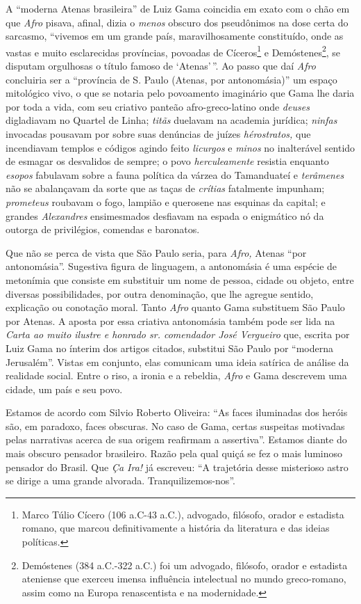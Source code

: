 A ``moderna Atenas brasileira'' de Luiz Gama coincidia em exato com o chão
em que \emph{Afro} pisava, afinal, dizia o \emph{menos} obscuro dos
pseudônimos na dose certa do sarcasmo, ``vivemos em um grande país,
maravilhosamente constituído, onde as vastas e muito esclarecidas
províncias, povoadas de Cíceros\footnote{Marco Túlio Cícero (106
  a.C-43 a.C.), advogado, filósofo, orador e estadista romano, que
  marcou definitivamente a história da literatura e das ideias
  políticas.} e Demóstenes\footnote{Demóstenes (384 a.C.-322 a.C.) foi
  um advogado, filósofo, orador e estadista ateniense que exerceu imensa
  influência intelectual no mundo greco-romano, assim como na Europa
  renascentista e na modernidade.}, se disputam orgulhosas o título
famoso de `Atenas'\,''. Ao passo que daí \emph{Afro} concluiria ser a
``província de S. Paulo (Atenas, por antonomásia)'' um espaço mitológico
vivo, o que se notaria pelo povoamento imaginário que Gama lhe daria por
toda a vida, com seu criativo panteão afro-greco-latino onde
\emph{deuses} digladiavam no Quartel de Linha; \emph{titãs} duelavam na
academia jurídica; \emph{ninfas} invocadas pousavam por sobre suas
denúncias de juízes \emph{hérostratos,} que incendiavam templos e
códigos agindo feito \emph{licurgos} e \emph{minos} no inalterável
sentido de esmagar os desvalidos de sempre; o povo \emph{herculeamente}
resistia enquanto \emph{esopos} fabulavam sobre a fauna política da
várzea do Tamanduateí e \emph{terâmenes} não se abalançavam da sorte que
as taças de \emph{crítias} fatalmente impunham; \emph{prometeus}
roubavam o fogo, lampião e querosene nas esquinas da capital; e grandes
\emph{Alexandres} ensimesmados desfiavam na espada o enigmático nó da
outorga de privilégios, comendas e baronatos.

Que não se perca de vista que São Paulo seria, para \emph{Afro,} Atenas
``por antonomásia''. Sugestiva figura de linguagem, a antonomásia é uma
espécie de metonímia que consiste em substituir um nome de pessoa,
cidade ou objeto, entre diversas possibilidades, por outra denominação,
que lhe agregue sentido, explicação ou conotação moral. Tanto
\emph{Afro} quanto Gama substituem São Paulo por Atenas. A aposta por
essa criativa antonomásia também pode ser lida na \emph{Carta ao muito
ilustre e honrado sr. comendador José Vergueiro} que, escrita por Luiz
Gama no ínterim dos artigos citados, substitui São Paulo por ``moderna
Jerusalém''. Vistas em conjunto, elas comunicam uma ideia satírica de
análise da realidade social. Entre o riso, a ironia e a rebeldia,
\emph{Afro} e Gama descrevem uma cidade, um país e seu povo.

Estamos de acordo com Silvio Roberto Oliveira: ``As faces iluminadas dos
heróis são, em paradoxo, faces obscuras. No caso de Gama, certas
suspeitas motivadas pelas narrativas acerca de sua origem reafirmam a
assertiva''. Estamos diante do mais obscuro pensador brasileiro. Razão
pela qual quiçá se fez o mais luminoso pensador do Brasil. Que \emph{Ça
Ira!} já escreveu: ``A trajetória desse misterioso astro se dirige a uma
grande alvorada. Tranquilizemos-nos''.
